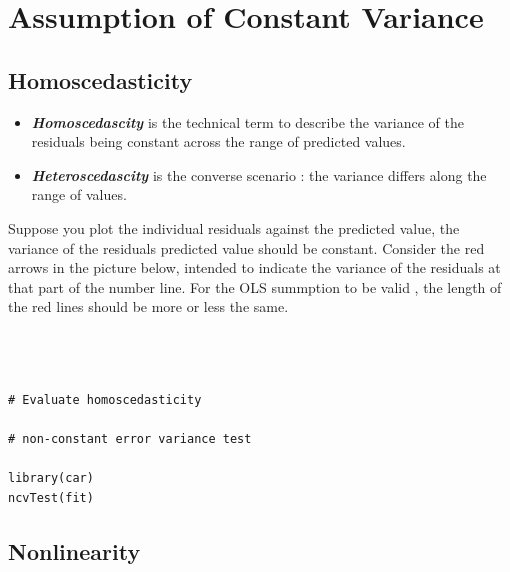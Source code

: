 \documentclass[residuals.tex]{subfiles}
\begin{document}
\Large
\section{Assumption of Constant Variance}
\subsection*{Homoscedasticity}
\begin{itemize}
\item \textbf{\textit{Homoscedascity}} is the technical term to describe the variance of the residuals being constant across the range of predicted values. 

\item \textbf{\textit{Heteroscedascity}} is the converse scenario : the variance differs along the range of values.
\end{itemize}


\noindent Suppose you plot the individual residuals against the predicted value, the variance of the residuals predicted value should be constant. 
\bigskip
\noindent Consider the red arrows in the picture below, intended to indicate the variance of the residuals at that part of the number line. For the OLS summption to be valid , the length of the red lines should be more or less the same.
\newpage

\begin{framed}

\begin{verbatim}	



# Evaluate homoscedasticity

# non-constant error variance test

library(car)
ncvTest(fit)
\end{verbatim}
\end{framed}


\subsection{Nonlinearity}
\end{document}
